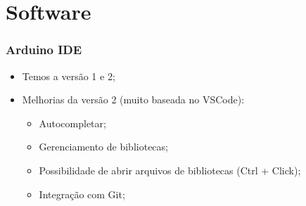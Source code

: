 \documentclass[12pt]{beamer}
\begin{document}

\section{Software}
\begin{frame}
    \frametitle{Arduino IDE}

    \begin{itemize}
        \item Temos a versão 1 e 2;
        \item Melhorias da versão 2 (muito baseada no VSCode):
        \begin{itemize}
            \item Autocompletar;
            \item Gerenciamento de bibliotecas;
            \item Possibilidade de abrir arquivos de bibliotecas (Ctrl + Click);
            \item Integração com Git;
        \end{itemize}
    \end{itemize}
\end{frame}
\end{document}
